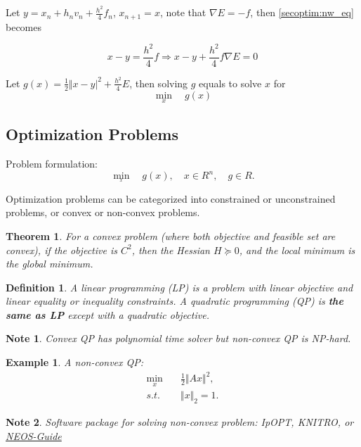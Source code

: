 \documentclass{fancydoc}
\newtheorem{mydef}{Definition}
\newtheorem{thm}{Theorem}
\newtheorem{note}{Note}
\newtheorem{ex}{Example}
\begin{document}
Let $y = x_n + h_nv_n + \frac{h^2}{4}f_n$, $x_{n+1} = x$, note that $\nabla E = -f$, then \eqref{secoptim:nw_eq} becomes

\begin{equation}
x - y = \frac{h^2}{4}f \Rightarrow x - y + \frac{h^2}{4}f\nabla E = 0
\end{equation}

Let $g(x) = \frac{1}{2}\Vert x-y\vert^2 + \frac{h^2}{4}E$, then solving $g$ equals to solve $x$ for
\begin{equation}
\min_{x} \quad g(x)
\end{equation}

\subsection{Optimization Problems}
Problem formulation:
\begin{equation}
\min_{_x} \quad g(x), \quad x\in \!R^n, \quad g\in \!R.
\end{equation}

Optimization problems can be categorized into constrained or unconstrained problems, or convex or non-convex problems. 

\begin{thm}
	For a convex problem (where both objective and feasible set are convex), if the objective is $\!C^2$, then the Hessian $H \succeq 0$, and the local minimum is the global minimum.
\end{thm}

\begin{mydef}
	A linear programming (LP) is a problem with linear objective and linear equality or inequality constraints. A quadratic programming (QP) is {\bf the same as LP} except with a quadratic objective.
\end{mydef}

\begin{note}
	Convex QP has polynomial time solver but non-convex QP is NP-hard.
\end{note}
\begin{ex}
	A non-convex QP: 
	\begin{subequations}
		\begin{align}
		\min_{x} \quad&\frac{1}{2} \Vert Ax \Vert^2, \\
		s.t. \quad & \Vert x \Vert_2 = 1.
		\end{align}
	\end{subequations}
\end{ex}
\begin{note}
	Software package for solving non-convex problem: {\rm IpOPT}, {\rm KNITRO}, or \href{https://neos-guide.org/}{NEOS-Guide} 
\end{note}
\end{document}
